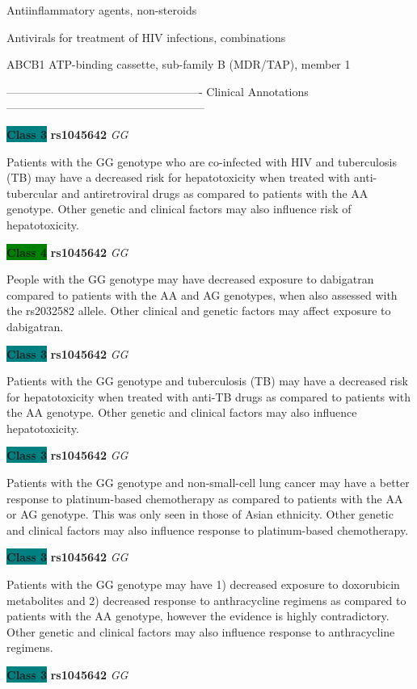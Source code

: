 \documentclass{resume} %
\begin{document}
\begin{rSection}{ Antiinflammatory agents, non-steroids }
\end{rSection}\begin{rSection}{ Antivirals for treatment of HIV infections, combinations }
\item[]

\begin{rSubsection}{ ABCB1 }{ ATP-binding cassette, sub-family B (MDR/TAP), member 1 }{}{}
\item[]

\item[] ---------------------------------------------------- Clinical Annotations -----------------------------------------------------\newline
\item \textbf{\colorbox{teal} {Class 3}} \textbf{ rs1045642 } \textit{ GG }
\item[] Patients with the GG genotype who are co-infected with HIV and tuberculosis (TB) may have a decreased risk for hepatotoxicity when treated with anti-tubercular and antiretroviral drugs as compared to patients with the AA genotype. Other genetic and clinical factors may also influence risk of hepatotoxicity.\item \textbf{\colorbox{green} {Class 4}} \textbf{ rs1045642 } \textit{ GG }
\item[] People with the GG genotype may have decreased exposure to dabigatran compared to patients with the AA and AG genotypes, when also assessed with the rs2032582 allele. Other clinical and genetic factors may affect exposure to dabigatran.\item \textbf{\colorbox{teal} {Class 3}} \textbf{ rs1045642 } \textit{ GG }
\item[] Patients with the GG genotype and tuberculosis (TB) may have a decreased risk for hepatotoxicity when treated with anti-TB drugs as compared to patients with the AA genotype. Other genetic and clinical factors may also influence hepatotoxicity.\item \textbf{\colorbox{teal} {Class 3}} \textbf{ rs1045642 } \textit{ GG }
\item[] Patients with the GG genotype and non-small-cell lung cancer may have a better response to platinum-based chemotherapy as compared to patients with the AA or AG genotype. This was only seen in those of Asian ethnicity. Other genetic and clinical factors may also influence response to platinum-based chemotherapy.\item \textbf{\colorbox{teal} {Class 3}} \textbf{ rs1045642 } \textit{ GG }
\item[] Patients with the GG genotype may have 1) decreased exposure to doxorubicin metabolites and 2) decreased response to anthracycline regimens as compared to patients with the AA genotype, however the evidence is highly contradictory. Other genetic and clinical factors may also influence response to anthracycline regimens.\item \textbf{\colorbox{teal} {Class 3}} \textbf{ rs1045642 } \textit{ GG }

\end{rSubsection}
\end{rSection}
\end{document}
